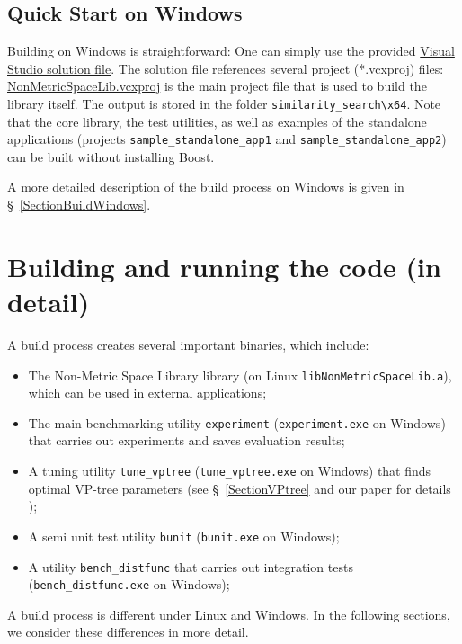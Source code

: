 \documentclass[runningheads,a4paper]{llncs}
\newcommand{\nonmetrlib}{Non-Metric Space Library}
\newcommand{\replocfile}{https://github.com/searchivarius/NonMetricSpaceLib/blob/develop/}
\newcommand{\ttt}[1]{\texttt{#1}}
\begin{document}
{\subsection{Quick Start on Windows}\label{QuickStartWindows}
Building on Windows is straightforward:
One can simply use the provided \href{\replocfile similarity_search/NonMetricSpaceLib.sln}{Visual Studio 
solution file}.
The solution file references several project (*.vcxproj) files: 
\href{\replocfile similarity_search/src/NonMetricSpaceLib.vcxproj}{NonMetricSpaceLib.vcxproj}
is the main project file that is used to build the library itself.
The output is stored in the folder \ttt{similarity\_search\textbackslash x64}.
Note that the core library, the test utilities,
 as well as examples of the standalone applications (projects \ttt{sample\_standalone\_app1}
and \ttt{sample\_standalone\_app2})
can be built without installing Boost. 

A more detailed description of the build process on Windows is given in \S~\ref{SectionBuildWindows}.

\section{Building and running the code (in detail)}

A build process creates several important binaries, which include:

\begin{itemize}
\item The \nonmetrlib{} library (on Linux \ttt{libNonMetricSpaceLib.a}),
which can be used in external applications;
\item The main benchmarking utility \ttt{experiment} (\ttt{experiment.exe} on Windows) 
that carries out experiments and saves evaluation results;
\item A tuning utility \ttt{tune\_vptree} (\ttt{tune\_vptree.exe} on Windows) 
that finds optimal VP-tree parameters (see \S~\ref{SectionVPtree} and our paper for details \cite{Boytsov_and_Bilegsaikhan:nips2013});
\item A semi unit test utility \ttt{bunit} (\ttt{bunit.exe} on Windows);
\item A utility \ttt{bench\_distfunc} that carries out integration tests (\ttt{bench\_distfunc.exe} on  Windows);
\end{itemize}

A build process is different under Linux and Windows. 
In  the following sections, we consider these differences in more detail. 

}
\end{document}
